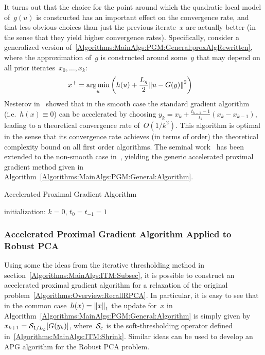 It turns out that the choice for the point around which the quadratic local model of~$g(u)$ is constructed has an important effect on the convergence rate, and that less obvious choices than just the previous iterate~$x$ are actually better (in the sense that they yield higher convergence rates). Specifically, consider a generalized version of~\eqref{Algorithms:MainAlgs:PGM:General:proxAlgRewritten}, where the approximation of~$g$ is constructed around some~$y$ that may depend on all prior iterates~$x_0,\dotsc,x_k$:
%
\begin{align}
x^+ &= \operatorname*{arg\,min}_u \left( h(u) +\frac{L_g}{2} {\left\|u-G(y)\right\|}_{}^{2} \right)
\label{Algorithms:MainAlgs:PGM:General:proxAlgGeneralized}
\end{align}
%
Nesterov in~\cite{Nesterov:1983uq} showed that in the smooth case the standard gradient algorithm (i.e.~$h(x) \equiv 0$) can be accelerated by choosing $y_k = x_k + \frac{t_{k-1}-1}{t_k}(x_k-x_{k-1})$, leading to a theoretical convergence rate of~$O(1/k^2)$. This algorithm is optimal in the sense that its convergence rate achieves (in terms of order) the theoretical complexity bound on all first order algorithms. The seminal work~\cite{Nesterov:1983uq} has been extended to the non-smooth case in~\cite{Beck:2009kx,Nesterov:2007kx}, yielding the generic accelerated proximal gradient method given in Algorithm~\ref{Algorithms:MainAlgs:PGM:General:Algorithm}.
%
\begin{algorithm}
\caption{Accelerated Proximal Gradient Algorithm}
initialization: $k=0$, $t_0=t_{-1} = 1$\;
\label{Algorithms:MainAlgs:PGM:General:Algorithm}
\end{algorithm}



\subsubsection{Accelerated Proximal Gradient Algorithm Applied to Robust PCA}
\label{Algorithms:MainAlgs:PGM:APGRPCA:Subsubsec}

Using some the ideas from the iterative thresholding method in section~\ref{Algorithms:MainAlgs:ITM:Subsec}, it is possible to construct an accelerated proximal gradient algorithm for a relaxation of the original problem~\eqref{Algorithms:Overview:RecallRPCA}. In particular, it is easy to see that in the common case~$h(x) = {\left\|x\right\|}_{1}^{}$ the update for~$x$ in Algorithm~\ref{Algorithms:MainAlgs:PGM:General:Algorithm} is simply given by $x_{k+1} = {\mathcal{S}}_{1/L_g}[G(y_k)]$, where~${\mathcal{S}}_\varepsilon$ is the soft-thresholding operator defined in~\eqref{Algorithms:MainAlgs:ITM:Shrink}. Similar ideas can be used to develop an APG algorithm for the Robust PCA problem. 

